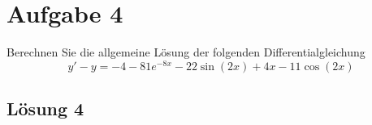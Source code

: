 \documentclass[main.tex]{subfiles}
\begin{document}
\section{Aufgabe 4}
Berechnen Sie die allgemeine Lösung der folgenden Differentialgleichung
\[
y' - y = -4 - 81e^{-8x} - 22\sin(2x) + 4x - 11\cos(2x)
\]

\subsection{Lösung 4}
\end{document}
